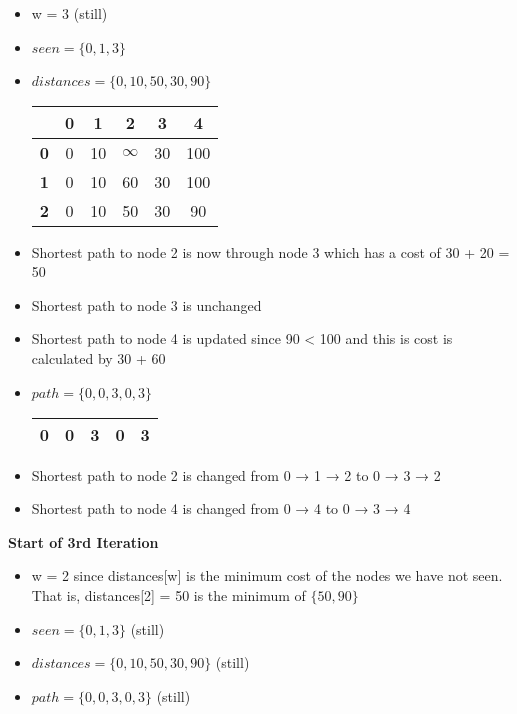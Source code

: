 \documentclass[10pt, 
a4paper, 
oneside, 
headinclude, footinclude, 
BCOR5mm]
{scrartcl}
\begin{document}
\begin{itemize}
    \item w = 3 (still)
    \item $seen = \{0, 1, 3\}$
    \item $distances = \{0, 10, 50, 30, 90\}$
    \begin{center}
        \begin{tabular}{|c|c|c|c|c|c|}
            \hline
            & \textbf{0} & \textbf{1} & \textbf{2} & \textbf{3} & \textbf{4} \\
            \hline
            \textbf{0} & 0 & 10 & $\infty$ & 30 & 100 \\
            \hline
            \textbf{1} & 0 & 10 & 60 & 30 & 100 \\
            \hline
            \textbf{2} & 0 & 10 & 50 & 30 & 90 \\
            \hline
        \end{tabular}
    \end{center}
    \item Shortest path to node 2 is now through node 3 which has a cost of 30 + 20 = 50
    \item Shortest path to node 3 is unchanged
    \item Shortest path to node 4 is updated since 90 < 100 and this is cost is calculated by 30 + 60
    \item $path = \{0, 0, 3, 0, 3\}$
    \begin{center}
        \begin{tabular}{|c|c|c|c|c|}
            \hline
            0 & 0 & 3 & 0 & 3 \\
            \hline
        \end{tabular}
    \end{center} 
    \item Shortest path to node 2 is changed from 0 → 1 → 2 to 0 → 3 → 2
    \item Shortest path to node 4 is changed from 0 → 4 to 0 → 3 → 4
\end{itemize}
\textbf{Start of 3rd Iteration}
\begin{itemize}
    \item w = 2 since distances[w] is the minimum cost of the nodes we have not seen. That is, distances[2] = 50 is the
    minimum of $\{50, 90\}$
    \item $seen = \{0, 1, 3\}$ (still)
    \item $distances = \{0, 10, 50, 30, 90\}$ (still)
    \item $path = \{0, 0, 3, 0, 3\}$ (still)
\end{itemize}
\end{document}

